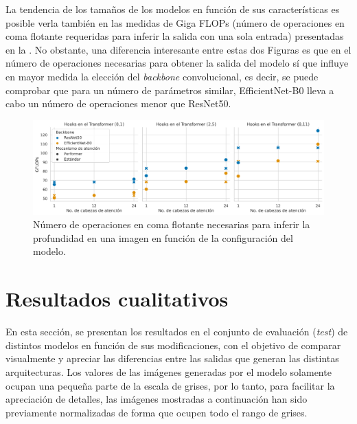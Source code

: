La tendencia de los tamaños de los modelos en función de sus características es posible verla también en las medidas de Giga FLOPs (número de operaciones en coma flotante requeridas para inferir la salida con una sola entrada) presentadas en la . No obstante, una diferencia interesante entre estas dos Figuras es que en el número de operaciones necesarias para obtener la salida del modelo sí que influye en mayor medida la elección del \textit{backbone} convolucional, es decir, se puede comprobar que para un número de parámetros similar, EfficientNet-B0 lleva a cabo un número de operaciones menor que ResNet50.

\begin{figure}[H]
\centering
\includegraphics[width=\linewidth]{imagenes/Resultados/gflops.png} 
\captionsetup{width=.95\linewidth}
\caption{Número de operaciones en coma flotante necesarias para inferir la profundidad en una imagen en función de la configuración del modelo.}
\label{fig:resultados-gflops}
\end{figure}













\pagebreak

\section{Resultados cualitativos}

En esta sección, se presentan los resultados en el conjunto de evaluación (\textit{test}) de distintos modelos en función de sus modificaciones, con el objetivo de comparar visualmente y apreciar las diferencias entre las salidas que generan las distintas arquitecturas. Los valores de las imágenes generadas por el modelo solamente ocupan una pequeña parte de la escala de grises, por lo tanto, para facilitar la apreciación de detalles, las imágenes mostradas a continuación han sido previamente normalizadas de forma que ocupen todo el rango de grises. 

